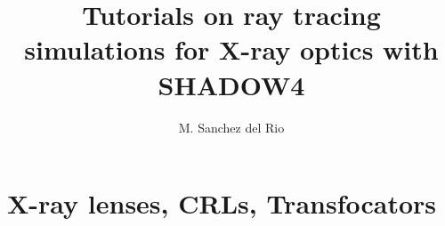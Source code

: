 \documentclass{ol-softwaremanual}
\title{Tutorials on ray tracing simulations for X-ray optics with SHADOW4}
\author{M. Sanchez del Rio}
\begin{document}
\maketitle

\tableofcontents

\newpage
\section{X-ray lenses, CRLs, Transfocators}


\end{document}
